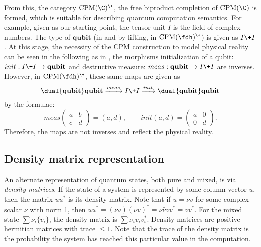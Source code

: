 From this, the category $\text{CPM}(\C)^{\+}$, the free biproduct completion of $\text{CPM}(\C)$ is
formed, which is suitable for describing quantum computation semantics. For example, given \fdh as
our starting point, the tensor unit $I$ is the field of complex numbers. The type of
$\mathbf{qubit}$ (in \fdh and by lifting, in $\text{CPM}(\fdh)^{\+}$) is given as $I\+I$. At this
stage, the necessity of the CPM construction to model physical reality can be seen in the following
as in \fdh, the morphisms initialization of a qubit: $init:I\+I \to \mathbf{qubit}$ and destructive
measure: $meas: \mathbf{qubit} \to I\+I$ are inverses. However, in $\text{CPM}(\fdh)^{\+}$, these
same maps are given as
\[
  \dual{\mathbf{qubit}} \* \mathbf{qubit} \xrightarrow{meas} I\+
    I \xrightarrow{init}\dual{\mathbf{qubit}} \* \mathbf{qubit}
\]
by the formulae:
\[
  meas
  \begin{pmatrix}
    a & b \\
    c & d
  \end{pmatrix}
  = (a,d), \qquad init(a,d) =
  \begin{pmatrix}
    a &0 \\
    0 & d
  \end{pmatrix}.
\]
Therefore, the maps are not inverses and reflect the physical reality.


\subsection{Density matrix representation}\label{sec:density}
An alternate representation of quantum states, both pure and mixed, is via \emph{density matrices}.
If the state of a system is represented by some column vector $u$, then the matrix $u u^{*}$ is its
density matrix. Note that if $u = \nu v$ for some complex scalar $\nu$ with norm 1, then $u u^{*} =
(\nu v) (\nu v)^{*} = \nu \bar{\nu} v v^{*} = v v^{*} $. For the mixed state $\sum
\nu_{i}\{v_{i}\}$, the density matrix is $\sum \nu_{i}v_{i}v_{i}^{*}$. Density matrices are
positive hermitian matrices with trace $\le 1$. Note that the trace of the density matrix is the
probability the system has reached this particular value in the computation.

